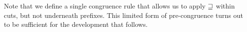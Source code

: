 \begin{AgdaAlign}
Note that we define a single congruence rule 
that allows us to apply $\sqsupseteq$ within cuts, but not underneath prefixes. This
limited form of pre-congruence turns out to be sufficient for the development
that follows.
\end{AgdaAlign}
